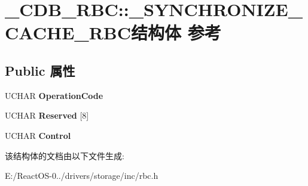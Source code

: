 \hypertarget{struct___c_d_b___r_b_c_1_1___s_y_n_c_h_r_o_n_i_z_e___c_a_c_h_e___r_b_c}{}\section{\+\_\+\+C\+D\+B\+\_\+\+R\+BC\+:\+:\+\_\+\+S\+Y\+N\+C\+H\+R\+O\+N\+I\+Z\+E\+\_\+\+C\+A\+C\+H\+E\+\_\+\+R\+B\+C结构体 参考}
\label{struct___c_d_b___r_b_c_1_1___s_y_n_c_h_r_o_n_i_z_e___c_a_c_h_e___r_b_c}
\subsection*{Public 属性}
\begin{DoxyCompactItemize}
\item 
\mbox{\label{struct___c_d_b___r_b_c_1_1___s_y_n_c_h_r_o_n_i_z_e___c_a_c_h_e___r_b_c_a096205fe165f890cde53898696ed5d7b}} 
U\+C\+H\+AR {\bfseries Operation\+Code}
\item 
\mbox{\label{struct___c_d_b___r_b_c_1_1___s_y_n_c_h_r_o_n_i_z_e___c_a_c_h_e___r_b_c_a4d2cc8c7c83fb0ea2e084fbd95278459}} 
U\+C\+H\+AR {\bfseries Reserved} \mbox{[}8\mbox{]}
\item 
\mbox{\label{struct___c_d_b___r_b_c_1_1___s_y_n_c_h_r_o_n_i_z_e___c_a_c_h_e___r_b_c_a3c33f0427e4aebd02c31f6800bdf1d75}} 
U\+C\+H\+AR {\bfseries Control}
\end{DoxyCompactItemize}


该结构体的文档由以下文件生成\+:\begin{DoxyCompactItemize}
\item 
E\+:/\+React\+O\+S-\/0../drivers/storage/inc/rbc.\+h\end{DoxyCompactItemize}
